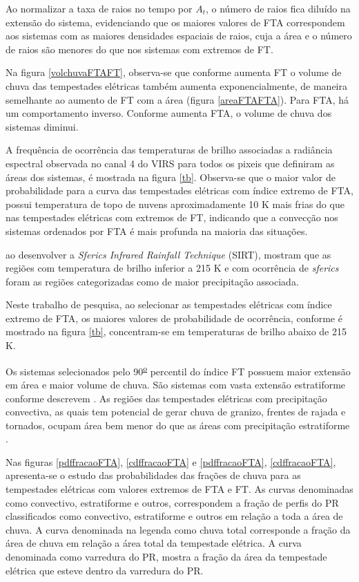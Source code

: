 Ao normalizar a taxa de raios no tempo por $A_t$, o número de raios fica diluído na extensão do sistema, evidenciando que os maiores valores de FTA correspondem aos sistemas com as maiores densidades espaciais de raios, cuja a área e o número de raios são menores do que nos sistemas com extremos de FT.

Na figura \ref{volchuvaFTAFT}, observa-se que conforme aumenta FT o volume de chuva das tempestades elétricas também aumenta exponencialmente, de maneira semelhante ao aumento de FT com a área (figura \ref{areaFTAFTA}). Para FTA, há um comportamento inverso. Conforme aumenta FTA, o volume de chuva dos sistemas diminui.  

A frequência de ocorrência das temperaturas de brilho associadas a radiância espectral observada no canal 4 do VIRS para todos os pixeis que definiram as áreas dos sistemas, é mostrada na figura \ref{tb}. Observa-se que o maior valor de probabilidade para a curva das tempestades elétricas com índice extremo de FTA, possui temperatura de topo de nuvens aproximadamente 10 K mais frias do que nas tempestades elétricas com extremos de FT, indicando que a convecção nos sistemas ordenados por FTA é mais profunda na maioria das situações.

 ao desenvolver a \textit{Sferics Infrared Rainfall Technique} (SIRT), mostram que as regiões com temperatura de brilho inferior a 215 K e com ocorrência de \textit{sferics} foram as regiões categorizadas como de maior precipitação associada.

Neste trabalho de pesquisa, ao selecionar as tempestades elétricas com índice extremo de FTA, os maiores valores de probabilidade de ocorrência, conforme é mostrado na figura \ref{tb}, concentram-se em temperaturas de brilho abaixo de 215 K.

Os sistemas selecionados pelo 90\textsuperscript{\underline{o}} percentil do índice FT possuem maior extensão em área e maior volume de chuva. São sistemas com vasta extensão estratiforme conforme descrevem . As regiões das tempestades elétricas com precipitação convectiva, as quais tem potencial de gerar chuva de granizo, frentes de rajada e tornados, ocupam área bem menor do que as áreas com  precipitação estratiforme \cite{Jr2007}.

Nas figuras \ref{pdffracaoFTA}, \ref{cdffracaoFTA} e \ref{pdffracaoFTA},  \ref{cdffracaoFTA}, apresenta-se o estudo das probabilidades das frações de chuva para as tempestades elétricas com valores extremos de FTA e FT. As curvas denominadas como convectivo, estratiforme e outros, correspondem a fração de perfis do PR classificados como convectivo, estratiforme e outros em relação a toda a área de chuva. A curva denominada na legenda como chuva total corresponde a fração da área de chuva em relação a área total da tempestade elétrica. A curva denominada como varredura do PR, mostra a fração da área da tempestade elétrica que esteve dentro da varredura do PR.

